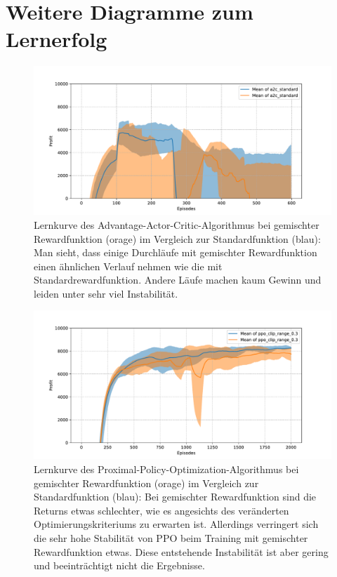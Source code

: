 \section{Weitere Diagramme zum Lernerfolg}
\begin{figure}[htbp]
	\centering
	\includegraphics[width=\textwidth]{appendix/mixed_rewards_a2c.pdf}
	\caption{
        Lernkurve des Advantage-Actor-Critic-Algorithmus bei gemischter Rewardfunktion (orage) im Vergleich zur Standardfunktion (blau):
        Man sieht, dass einige Durchläufe mit gemischter Rewardfunktion einen ähnlichen Verlauf nehmen wie die mit Standardrewardfunktion.
        Andere Läufe machen kaum Gewinn und leiden unter sehr viel Instabilität.
    }
	\label{grafic:MixedRewardsA2C}
\end{figure}
\begin{figure}[htbp]
	\centering
	\includegraphics[width=\textwidth]{appendix/mixed_rewards_ppo.pdf}
	\caption{
        Lernkurve des Proximal-Policy-Optimization-Algorithmus bei gemischter Rewardfunktion (orage) im Vergleich zur Standardfunktion (blau):
        Bei gemischter Rewardfunktion sind die Returns etwas schlechter, wie es angesichts des veränderten Optimierungskriteriums zu erwarten ist.
        Allerdings verringert sich die sehr hohe Stabilität von PPO beim Training mit gemischter Rewardfunktion etwas.
        Diese entstehende Instabilität ist aber gering und beeinträchtigt nicht die Ergebnisse.
    }
	\label{grafic:MixedRewardsPPO}
\end{figure}
